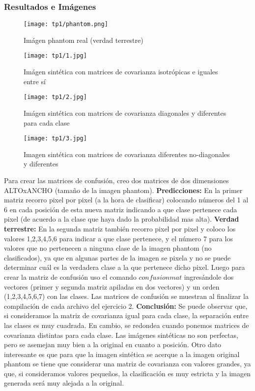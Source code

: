 \documentclass[12pt]{article}
\begin{document}
\subsubsection{Resultados e Imágenes}
\begin{figure}[H]
\centering
\texttt{[image: tp1/phantom.png]}
\caption{Imágen phantom real (verdad terrestre)}
\end{figure}
\begin{figure}[H]
\centering
\texttt{[image: tp1/1.jpg]}
\caption{Imágen sintética con matrices de covarianza isotrópicas e iguales entre sí}
\texttt{[image: tp1/2.jpg]}
\caption{Imágen sintética con matrices de covarianza diagonales y diferentes para cada clase}
\end{figure}
\begin{figure}[H]
\centering
\texttt{[image: tp1/3.jpg]}
\caption{Imagen sintética con matrices de covarianza diferentes no-diagonales y diferentes}
 \label{fig:3}
\end{figure}
Para crear las matrices de confusión, creo dos matrices de dos dimensiones ALTOxANCHO (tamaño de la imagen phantom). \newline
\newline
\textbf{Predicciones:}\newline
En la primer matriz recorro pixel por pixel (a la hora de clasificar) colocando números del 1 al 6 en cada posición de esta nueva matriz indicando a que clase pertenece cada pixel (de acuerdo a la clase que haya dado la probabilidad mas alta).\newline\newline
\textbf{Verdad terrestre:}\newline
En la segunda matriz también recorro pixel por pixel y coloco los valores 1,2,3,4,5,6 para indicar a que clase pertenece, y el número 7 para los valores que no pertenecen a ninguna clase de la imagen phantom (no clasificados), ya que en algunas partes de la imagen se pixela y no se puede determinar cuál es la verdadera clase a la que pertenece dicho pixel. \newline
Luego para crear la matriz de confusión uso el comando $confusionmat$ ingresándole dos vectores (primer y segunda matriz apiladas en dos vectores) y un orden (1,2,3,4,5,6,7) con las clases. Las matrices de confusión se muestran al finalizar la compilación de cada archivo del ejercicio 2.\newline\newline
\textbf{Conclusión:}\newline
Se puede observar que, si consideramos la matriz de covarianza igual para cada clase, la separación entre las clases es muy cuadrada. En cambio, se redondea cuando ponemos matrices de covarianza distintas para cada clase. Las imágenes sintéticas no son perfectas, pero se asemejan muy bien a la original en cuanto a posición. \newline
Otro dato interesante es que para que la imagen sintética se acerque a la imagen original phantom se tiene que considerar una matriz de covarianza con valores grandes, ya que, si consideramos valores pequeños, la clasificación es muy estricta y la imagen generada será muy alejada a la original.
\end{document}
